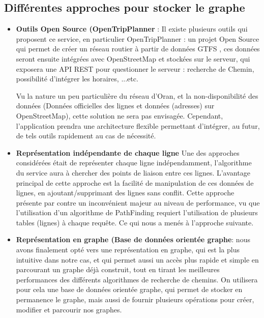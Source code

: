 \subsection{Différentes approches pour stocker le graphe}
\begin{itemize}
	\item \textbf{Outils Open Source (OpenTripPlanner} : 
	      Il existe plusieurs outils qui proposent ce service, en particulier OpenTripPlanner : un projet Open Source qui permet de créer un réseau routier à partir de données GTFS , ces données seront ensuite intégrées avec OpenStreetMap et stockées sur le serveur, qui exposera une API REST pour questionner le serveur : recherche de Chemin, possibilité d'intégrer les horaires, ...etc.
	      		
	      Vu la nature un peu particulière du réseau d'Oran, et la non-disponibilité des données (Données officielles des lignes et données (adresses) sur OpenStreetMap), cette solution ne sera pas envisagée. 
	      Cependant, l'application prendra une architecture flexible permettant d'intégrer, au futur, de tels outils rapidement au cas de nécessité.
	\item \textbf{Représentation indépendante de chaque ligne}
	      Une des approches considérées était de représenter chaque ligne indépendamment, l'algorithme du service aura à chercher des points de liaison entre ces lignes.
	      L'avantage principal de cette approche est la facilité de manipulation de ces données de lignes, en ajoutant/supprimant des lignes sans conflit.
	      Cette approche présente par contre un inconvénient majeur au niveau de performance, vu que l'utilisation d'un algorithme de PathFinding requiert l'utilisation de plusieurs tables (lignes) à chaque requête. Ce qui nous a menés à l'approche suivante.
	\item \textbf{Représentation en graphe (Base de données orientée graphe}: nous avons finalement opté vers une représentation en graphe, qui est la plus intuitive dans notre cas, et qui permet aussi un accès plus rapide et simple en parcourant un graphe déjà construit, tout en tirant les meilleures performances des différents algorithmes de recherche de chemins.
	On utilisera pour cela une base de données orientée graphe, qui permet de stocker en permanence le graphe, mais aussi de fournir plusieurs opérations pour créer, modifier et parcourir nos graphes.
	

\end{itemize}
